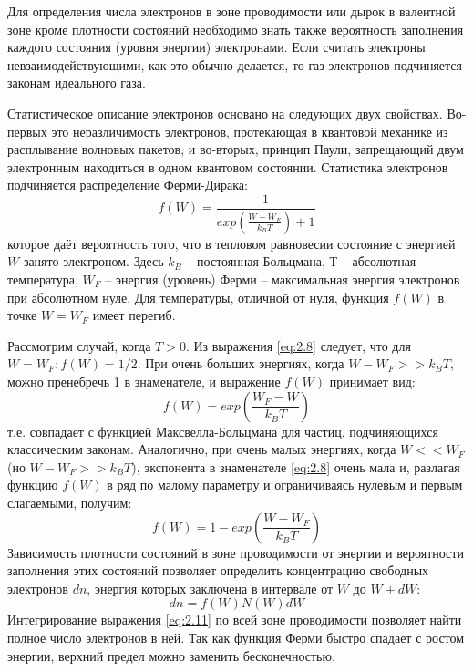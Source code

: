 Для определения числа электронов в зоне проводимости или дырок в валентной зоне кроме плотности состояний необходимо
знать также вероятность заполнения каждого состояния (уровня энергии) электронами. Если считать электроны
невзаимодействующими, как это обычно делается, то газ электронов подчиняется законам идеального газа. 

Статистическое описание электронов основано на следующих двух свойствах. Во-первых это неразличимость электронов,
протекающая в квантовой механике из расплывание волновых пакетов, и во-вторых, принцип Паули, запрещающий двум
электронным находиться в одном квантовом состоянии. Статистика электронов подчиняется распределение Ферми-Дирака:   
\begin{equation}
	f(W) = \frac{1}{exp (\frac{W-W_F}{k_B T})+1}
	\label{eq:2.8}
\end{equation}
которое даёт вероятность того, что в тепловом равновесии состояние с энергией $W$ занято электроном. Здесь $k_B$ –
постоянная Больцмана, $Т$ – абсолютная температура, $W_F$ – энергия (уровень) Ферми – максимальная энергия электронов при
абсолютном нуле. Для температуры, отличной от нуля, функция $f(W)$ в точке $W = W_F$ имеет перегиб.

Рассмотрим случай, когда $T > 0$. Из выражения \eqref{eq:2.8} следует, что для $W=W_F: f(W) =1/2$. При очень больших энергиях, когда 
$ W-W_F>> k_B T $, можно пренебречь 1 в знаменателе, и выражение $f(W)$ принимает вид:
\begin{equation}
	f(W) = exp (\frac{W_F-W}{k_B T})
	\label{eq:2.9}
\end{equation} 
т.е. совпадает с функцией Максвелла-Больцмана для частиц, подчиняющихся классическим законам. Аналогично, при очень
малых энергиях, когда $W<<W_F$ (но $W-W_F>>k_B T$), экспонента в знаменателе \eqref{eq:2.8} очень мала и, разлагая функцию $f(W)$ в ряд по
малому параметру и ограничиваясь нулевым и первым слагаемыми, получим: 
\begin{equation}
	f(W) = 1 - exp( \frac{W-W_F}{k_BT})
	\label{eq:2.10}
\end{equation}
Зависимость плотности состояний в зоне проводимости от энергии и вероятности заполнения этих состояний позволяет
определить концентрацию свободных электронов $dn$, энергия которых заключена в интервале от $W$ до $W+dW$:
\begin{equation}
	dn = f(W) N(W)dW
	\label{eq:2.11}
\end{equation}
Интегрирование выражения \eqref{eq:2.11} по всей зоне проводимости позволяет найти полное число электронов в ней. Так как функция
Ферми быстро спадает с ростом энергии, верхний предел можно заменить бесконечностью. 

